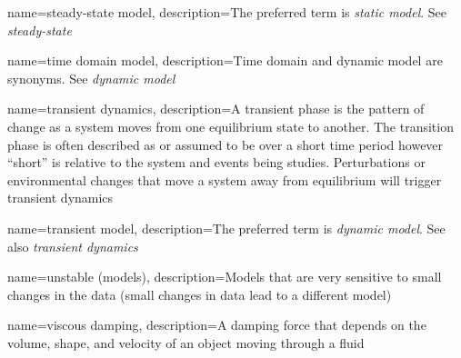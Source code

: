 {
	name=steady-state model,
	description=The preferred term is \textit{static model}.  See \emph{steady-state}
}


{
	name=time domain model,
	description=Time domain and dynamic model are synonyms.  See \emph{dynamic model}
}

{
	name=transient dynamics,
	description=A transient phase is the pattern of change as a system moves from one equilibrium state to another.  The transition phase is often described as\comma{} or assumed to be\comma{} over a short time period\comma{} however\comma{} ``short'' is relative to the system and events being studies.  Perturbations or environmental changes that move a system away from equilibrium will trigger transient dynamics
}

{
	name=transient model,
	description=The preferred term is \textit{dynamic model}.  See also \emph{transient dynamics}
}


{
    name=unstable (models),
    description=Models that are very sensitive to small changes in the data (small changes in data lead to a different model)
}

{
	name=viscous damping,
	description={A damping force that depends on the volume, shape, and velocity of an object moving through a fluid}
}

